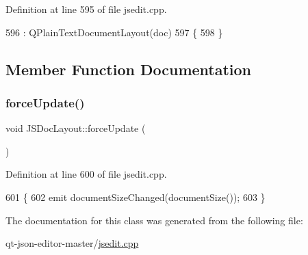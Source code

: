 Definition at line 595 of file jsedit.\+cpp.


\begin{DoxyCode}
596     : QPlainTextDocumentLayout(doc)
597 \{
598 \}
\end{DoxyCode}


\subsection{Member Function Documentation}
\mbox{\label{class_j_s_doc_layout_a181d392df06a4e6fca1f38b3a5a86a2c}} 
\subsubsection{\texorpdfstring{force\+Update()}{forceUpdate()}}
{\footnotesize\ttfamily void J\+S\+Doc\+Layout\+::force\+Update (\begin{DoxyParamCaption}{ }\end{DoxyParamCaption})}



Definition at line 600 of file jsedit.\+cpp.


\begin{DoxyCode}
601 \{
602     emit documentSizeChanged(documentSize());
603 \}
\end{DoxyCode}


The documentation for this class was generated from the following file\+:\begin{DoxyCompactItemize}
\item 
qt-\/json-\/editor-\/master/\hyperlink{jsedit_8cpp}{jsedit.\+cpp}\end{DoxyCompactItemize}
